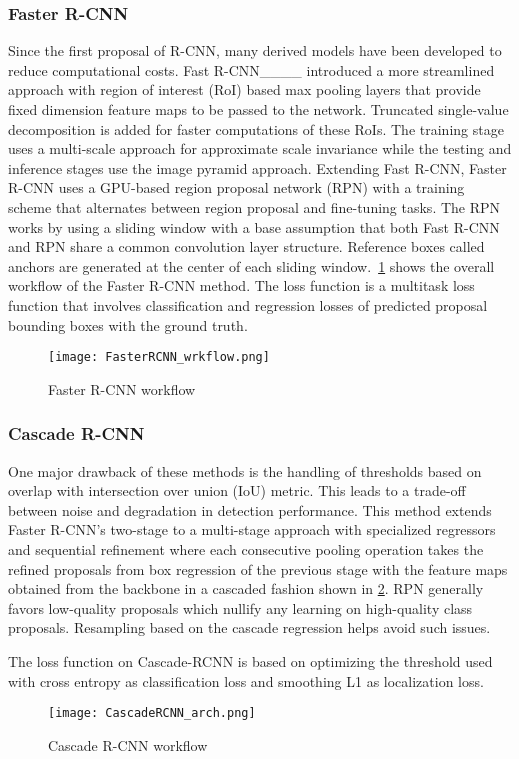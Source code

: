 \subsubsection{Faster R-CNN}
\label{subsubsec: Faster R-CNN}

Since the first proposal of R-CNN, many derived models have been developed to reduce computational costs. Fast R-CNN____ introduced a more streamlined approach with region of interest (RoI) based max pooling layers that provide fixed dimension feature maps to be passed to the network. Truncated single-value decomposition is added for faster computations of these RoIs. The training stage uses a multi-scale approach for approximate scale invariance while the testing and inference stages use the image pyramid approach. Extending Fast R-CNN, Faster R-CNN uses a GPU-based region proposal network (RPN) with a training scheme that alternates between region proposal and fine-tuning tasks. The RPN works by using a sliding window with a base assumption that both Fast R-CNN and RPN share a common convolution layer structure. Reference boxes called anchors are generated at the center of each sliding window.~\cref{fig:fasterrcnn} shows the overall workflow of the Faster R-CNN method. The loss function is a multitask loss function that involves classification and regression losses of predicted proposal bounding boxes with the ground truth.

\begin{figure}[!htb]
\centering
\texttt{[image: FasterRCNN\_wrkflow.png]}
\caption{Faster R-CNN workflow}
\label{fig:fasterrcnn}
\end{figure}


\subsubsection{Cascade R-CNN}
\label{subsubsec: Cascade R-CNN}

One major drawback of these methods is the handling of thresholds based on overlap with intersection over union (IoU) metric. This leads to a trade-off between noise and degradation in detection performance. This method extends Faster R-CNN's two-stage to a multi-stage approach with specialized regressors and sequential refinement where each consecutive pooling operation takes the refined proposals from box regression of the previous stage with the feature maps obtained from the backbone in a cascaded fashion shown in \cref{fig:cascadercnn}. RPN generally favors low-quality proposals which nullify any learning on high-quality class proposals. Resampling based on the cascade regression helps avoid such issues. 

The loss function on Cascade-RCNN is based on optimizing the threshold used with cross entropy as classification loss and smoothing L1 as localization loss.

\begin{figure}[!htb]
\centering
\texttt{[image: CascadeRCNN\_arch.png]}
\caption{Cascade R-CNN workflow}
\label{fig:cascadercnn}
\end{figure}